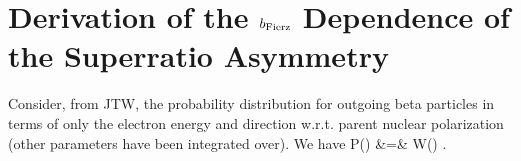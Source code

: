 %
%
%
%
\chapter[SuperRatio]{Derivation of the $b_{\mathrm{Fierz}}$ Dependence of the Superratio Asymmetry}

Consider, from JTW, the probability distribution for outgoing beta particles in terms of only the electron energy and direction w.r.t. parent nuclear polarization (other parameters have been integrated over).  We have
\bea
P(\Ebeta) &=& W(\Ebeta) .
\eea

